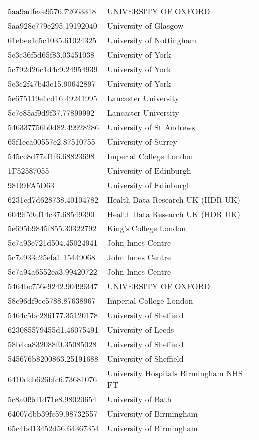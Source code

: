 \begin{tabular}{ll}
5aa9adfeae9576.72663318 & UNIVERSITY OF OXFORD \\
5aa928e779e295.19192040 & University of Glasgow \\
61ebee1c5c1035.61024325 & University of Nottingham \\
5e3c36f5d65f83.03451038 & University of York \\
5c792d26c1d4c9.24954939 & University of York \\
5e3c2f47b43c15.90642897 & University of York \\
5e675119e1cd16.49241995 & Lancaster University \\
5c7e85af9d9f37.77899992 & Lancaster University \\
546337756b0d82.49928286 & University of St Andrews \\
65f1eca00557e2.87510755 & University of Surrey \\
545cc8d77af1f6.68823698 & Imperial College London \\
1F52587055 & University of Edinburgh \\
98D9FA5D63 & University of Edinburgh \\
6231ed7d628738.40104782 & Health Data Research UK (HDR UK) \\
6049f59af14c37.68549390 & Health Data Research UK (HDR UK) \\
5e695b9845f855.30322792 & King's College London \\
5c7a93e721d504.45024941 & John Innes Centre \\
5c7a933c25efa1.15449068 & John Innes Centre \\
5c7a94a6552ea3.99420722 & John Innes Centre \\
5464bc756e9242.90499347 & UNIVERSITY OF OXFORD \\
58c96df9cc5788.87638967 & Imperial College London \\
5464c5bc286177.35120178 & University of Sheffield \\
623085579455d1.46075491 & University of Leeds \\
58b4ca832088f0.35085028 & University of Sheffield \\
545676b8200863.25191688 & University of Sheffield \\
6410dcb626bfc6.73681076 & University Hospitals Birmingham NHS FT \\
5c8a0f9d1d71e8.98020654 & University of Bath \\
64007dbb39fc59.98732557 & University of Birmingham \\
65c4bd13452d56.64367354 & University of Birmingham \\

\end{tabular}
